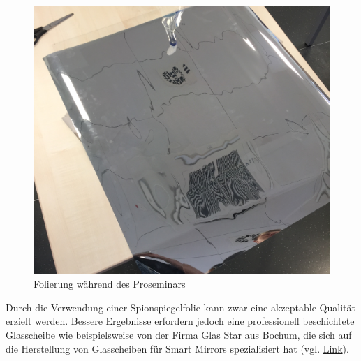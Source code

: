 \begin{figure}
		\includegraphics[scale=0.05]{bilder/spionspiegel.jpg}
		\caption{Folierung während des Proseminars}
\end{figure}
Durch die Verwendung einer Spionspiegelfolie kann zwar eine akzeptable Qualität erzielt werden. Bessere Ergebnisse erfordern jedoch eine professionell beschichtete Glasscheibe wie beispielsweise von der Firma Glas Star aus Bochum, die sich auf die Herstellung von Glasscheiben für Smart Mirrors spezialisiert hat (vgl. \href{https://www.glas-star.de/spionspiegelnachmass/chrome-spy-spiegel/}{Link}). 	
	





